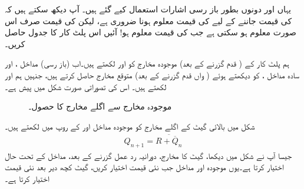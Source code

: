 یہاں  اور  دونوں بطور باز رسی اشارات استعمال کیے گئے ہیں۔ آپ دیکھ سکتے ہیں کہ  کی قیمت جاننے کے لیے  کی قیمت معلوم ہونا ضروری ہے، لیکن  کی قیمت صرف اس صورت معلوم ہو سکتی ہے جب  کی قیمت معلوم ہو! آئیں اس پلٹ کار کا جدول حاصل کریں۔

ہم پلٹ کار کے (  قدم گزرنے کے بعد) موجودہ مخارج کو  اور  لکھتے ہیں۔اب (باز رسی) مداخل
 ،  اور سادہ مداخل  ،  کو دیکھتے ہوئے (  واں قدم گزرنے کے بعد) متوقع مخارج حاصل کرتے ہیں، جنہیں ہم  اور  لکھتے ہیں۔ اس کی تصوراتی صورت
 شکل  میں پیش ہے۔

\begin{figure}
\centering
{}
\caption{موجودہ مخارج سے اگلے مخارج کا حصول۔}
\label{شکل_ترتیبی_اگلا_مخارج}
\end{figure}

شکل  میں بالائی گیٹ  کے اگلے مخارج  کو موجودہ مداخل  اور  کے روپ میں لکھتے ہیں۔
 \begin{align}\label{مساوات_ترتیبی_اگلا_کیو}
 Q_{n+1}=\overline{R+\overline{Q}_n}
 \end{align}
 جیسا آپ نے شکل  میں دیکھا، گیٹ کا مخارج، دورانیہ رد عمل گزرنے کے بعد، مداخل کے تحت حال اختیار کرتا ہے۔یوں موجودہ  اور مداخل  جب نئی قیمت اختیار کریں، گیٹ کچھ دیر بعد نئی قیمت  اختیار کرتا ہے۔
 
